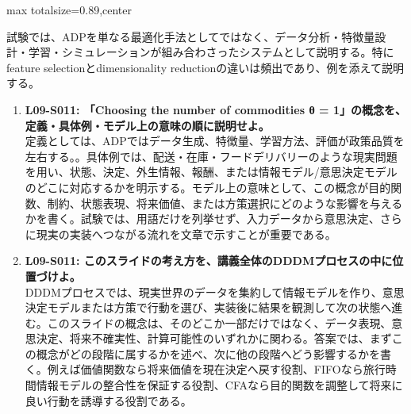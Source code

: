 \begin{minipage}[t]{0.58\textwidth}
\begin{adjustbox}{max totalsize={\textwidth}{0.89\textheight},center}
\begin{minipage}{\textwidth}
試験では、ADPを単なる最適化手法としてではなく、データ分析・特徴量設計・学習・シミュレーションが組み合わさったシステムとして説明する。特にfeature selectionとdimensionality reductionの違いは頻出であり、例を添えて説明する。\par{}\begin{enumerate}\item \textbf{L09-S011: 「Choosing the number of commodities θ = 1」の概念を、定義・具体例・モデル上の意味の順に説明せよ。}\\定義としては、ADPではデータ生成、特徴量、学習方法、評価が政策品質を左右する。。具体例では、配送・在庫・フードデリバリーのような現実問題を用い、状態、決定、外生情報、報酬、または情報モデル/意思決定モデルのどこに対応するかを明示する。モデル上の意味として、この概念が目的関数、制約、状態表現、将来価値、または方策選択にどのような影響を与えるかを書く。試験では、用語だけを列挙せず、入力データから意思決定、さらに現実の実装へつながる流れを文章で示すことが重要である。\item \textbf{L09-S011: このスライドの考え方を、講義全体のDDDMプロセスの中に位置づけよ。}\\DDDMプロセスでは、現実世界のデータを集約して情報モデルを作り、意思決定モデルまたは方策で行動を選び、実装後に結果を観測して次の状態へ進む。このスライドの概念は、そのどこか一部だけではなく、データ表現、意思決定、将来不確実性、計算可能性のいずれかに関わる。答案では、まずこの概念がどの段階に属するかを述べ、次に他の段階へどう影響するかを書く。例えば価値関数なら将来価値を現在決定へ戻す役割、FIFOなら旅行時間情報モデルの整合性を保証する役割、CFAなら目的関数を調整して将来に良い行動を誘導する役割である。\end{enumerate}
\end{minipage}
\end{adjustbox}
\end{minipage}


